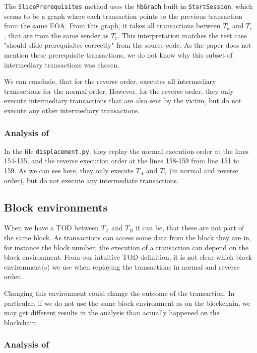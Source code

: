 \documentclass[draft,final]{vutinfth} %
\begin{document}
The \verb|SlicePrerequisites| method uses the \verb|hbGraph| built in \verb|StartSession|, which seems to be a graph where each transaction points to the previous transaction from the same EOA. From this graph, it takes all transactions between $T_a$ and $T_v$, that are from the same sender as $T_v$. This interpretation matches the test case "should slide prerequisites correctly" from the source code. As the paper does not mention these prerequisite transactions, we do not know why this subset of intermediary transactions was chosen.

We can conclude, that for the reverse order, \cite{zhang_combatting_2023} executes all intermediary transactions for the normal order. However, for the reverse order, they only execute intermediary transactions that are also sent by the victim, but do not execute any other intermediary transactions.

\subsubsection{Analysis of \cite{torres_frontrunner_2021}}

In the file \verb|displacement.py|, they replay the normal execution order at the lines 154-155, and the reverse execution order at the lines 158-159 from line 151 to 159. As we can see here, they only execute $T_A$ and $T_V$ (in normal and reverse order), but do not execute any intermediate transactions.

\subsection{Block environments}

When we have a TOD between $T_A$ and $T_B$ it can be, that these are not part of the same block. As transactions can access some data from the block they are in, for instance the block number, the execution of a transaction can depend on the block environment. From our intuitive TOD definition, it is not clear which block environment(s) we use when replaying the transactions in normal and reverse order.

Changing this environment could change the outcome of the transaction. In particular, if we do not use the same block environment as on the blockchain, we may get different results in the analysis than actually happened on the blockchain.

\subsubsection{Analysis of \cite{zhang_combatting_2023}}
\end{document}
